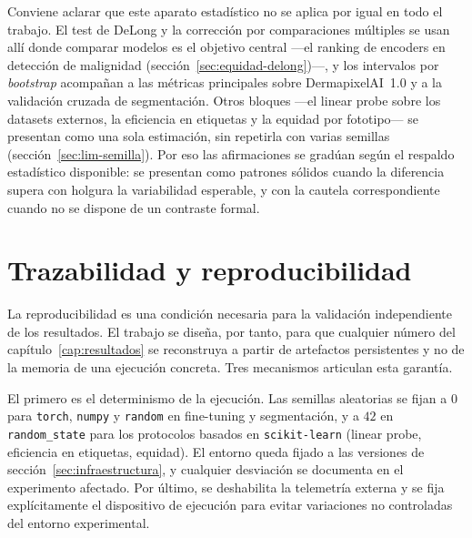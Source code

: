 Conviene aclarar que este aparato estadístico no se aplica por igual
en todo el trabajo. El test de DeLong y la corrección por
comparaciones múltiples se usan allí donde comparar modelos es el
objetivo central ---el ranking de encoders en detección de
malignidad (sección~\ref{sec:equidad-delong})---, y los intervalos por
\emph{bootstrap} acompañan a las métricas principales sobre
DermapixelAI~1.0 y a la validación cruzada de segmentación. Otros
bloques ---el linear probe sobre los datasets externos, la eficiencia
en etiquetas y la equidad por fototipo--- se presentan como una sola
estimación, sin repetirla con varias semillas
(sección~\ref{sec:lim-semilla}). Por eso las afirmaciones se gradúan
según el respaldo estadístico disponible: se presentan como patrones
sólidos cuando la diferencia supera con holgura la variabilidad
esperable, y con la cautela correspondiente cuando no se dispone de un
contraste formal.

\section{Trazabilidad y reproducibilidad}
\label{sec:reproducibilidad}

La reproducibilidad es una condición necesaria para la validación
independiente de los resultados. El trabajo se diseña, por tanto,
para que cualquier número del capítulo~\ref{cap:resultados} se
reconstruya a partir de artefactos persistentes y no de la memoria
de una ejecución concreta. Tres mecanismos articulan esta garantía.

El primero es el determinismo de la ejecución. Las semillas
aleatorias se fijan a $0$ para \texttt{torch}, \texttt{numpy} y
\texttt{random} en fine-tuning y segmentación, y a $42$ en
\texttt{random\_state} para los protocolos basados en
\texttt{scikit-learn} (linear probe, eficiencia en etiquetas,
equidad). El entorno queda fijado a las versiones de
sección~\ref{sec:infraestructura}, y cualquier desviación se
documenta en el experimento afectado. Por último, se deshabilita la
telemetría externa y se fija explícitamente el dispositivo de
ejecución para evitar variaciones no controladas del entorno
experimental.

